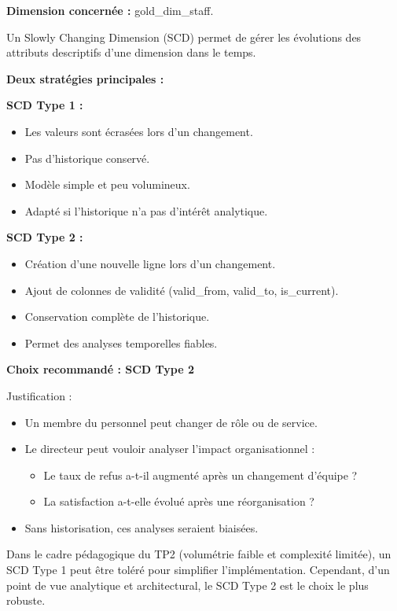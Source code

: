 \documentclass[11pt,a4paper]{article}
\begin{document}
\begin{enumerate}
\begin{tcolorbox}[title=\textbf{Stratégie SCD proposée et justification :}, colback=gray!5, colframe=black, boxrule=0.8pt, arc=2mm]
    \textbf{Dimension concernée :} gold\_dim\_staff.

    Un Slowly Changing Dimension (SCD) permet de gérer les évolutions
    des attributs descriptifs d’une dimension dans le temps.

    \textbf{Deux stratégies principales :}

    \textbf{SCD Type 1 :}
    \begin{itemize}
    \item Les valeurs sont écrasées lors d’un changement.
    \item Pas d’historique conservé.
    \item Modèle simple et peu volumineux.
    \item Adapté si l’historique n’a pas d’intérêt analytique.
    \end{itemize}

    \textbf{SCD Type 2 :}
    \begin{itemize}
    \item Création d’une nouvelle ligne lors d’un changement.
    \item Ajout de colonnes de validité (valid\_from, valid\_to, is\_current).
    \item Conservation complète de l’historique.
    \item Permet des analyses temporelles fiables.
    \end{itemize}

    \textbf{Choix recommandé : SCD Type 2}

    Justification :
    \begin{itemize}
    \item Un membre du personnel peut changer de rôle ou de service.
    \item Le directeur peut vouloir analyser l’impact organisationnel :
    \begin{itemize}
    \item Le taux de refus a-t-il augmenté après un changement d’équipe ?
    \item La satisfaction a-t-elle évolué après une réorganisation ?
    \end{itemize}
    \item Sans historisation, ces analyses seraient biaisées.
    \end{itemize}

    Dans le cadre pédagogique du TP2 (volumétrie faible et complexité limitée),
    un SCD Type 1 peut être toléré pour simplifier l’implémentation.
    Cependant, d’un point de vue analytique et architectural,
    le SCD Type 2 est le choix le plus robuste.


\end{tcolorbox}
\end{enumerate}
\end{document}
